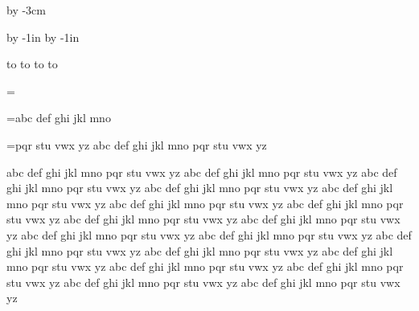 







\hsize=210mm
\vsize=297mm

\parindent=0pt

\advance\vsize by -3cm

\advance\voffset by -1in
\advance\hoffset by -1in



\def\epsfsize#1#2{#1}

\vbox to 
\eject
\vbox to 
\eject
\vbox to 
\eject
\vbox to 
\eject

\bye

\tracingall
{}

\newbox\collectbox

\collectbox=\vbox{}

\collectbox=\vbox{\unvcopy\collectbox abc def ghi jkl mno}

\unvcopy\collectbox

\vskip1in

\collectbox=\vbox{\unvcopy\collectbox pqr stu vwx yz abc def ghi jkl mno pqr stu vwx yz}

\unvcopy\collectbox


\bye


abc def ghi jkl mno pqr stu vwx yz abc def ghi jkl mno pqr stu vwx yz
abc def ghi jkl mno pqr stu vwx yz abc def ghi jkl mno pqr stu vwx yz
abc def ghi jkl mno pqr stu vwx yz abc def ghi jkl mno pqr stu vwx yz
abc def ghi jkl mno pqr stu vwx yz abc def ghi jkl mno pqr stu vwx yz
abc def ghi jkl mno pqr stu vwx yz abc def ghi jkl mno pqr stu vwx yz
abc def ghi jkl mno pqr stu vwx yz abc def ghi jkl mno pqr stu vwx yz
abc def ghi jkl mno pqr stu vwx yz abc def ghi jkl mno pqr stu vwx yz
abc def ghi jkl mno pqr stu vwx yz abc def ghi jkl mno pqr stu vwx yz
abc def ghi jkl mno pqr stu vwx yz abc def ghi jkl mno pqr stu vwx yz




\bye



